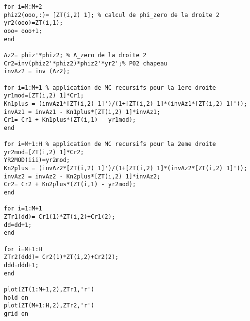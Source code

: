 \begin{appendices}
\begin{lstlisting}
for i=M:M+2
phiz2(ooo,:)= [ZT(i,2) 1]; % calcul de phi_zero de la droite 2
yr2(ooo)=ZT(i,1);
ooo= ooo+1;
end

Az2= phiz'*phiz2; % A_zero de la droite 2
Cr2=inv(phiz2'*phiz2)*phiz2'*yr2';% P02 chapeau
invAz2 = inv (Az2);

for i=1:M+1 % application de MC recursifs pour la 1ere droite
yr1mod=[ZT(i,2) 1]*Cr1;
Kn1plus = (invAz1*[ZT(i,2) 1]')/(1+[ZT(i,2) 1]*(invAz1*[ZT(i,2) 1]'));
invAz1 = invAz1 - Kn1plus*[ZT(i,2) 1]*invAz1;
Cr1= Cr1 + Kn1plus*(ZT(i,1) - yr1mod);
end

for i=M+1:H % application de MC recursifs pour la 2eme droite
yr2mod=[ZT(i,2) 1]*Cr2;
YR2MOD(iii)=yr2mod;
Kn2plus = (invAz2*[ZT(i,2) 1]')/(1+[ZT(i,2) 1]*(invAz2*[ZT(i,2) 1]'));
invAz2 = invAz2 - Kn2plus*[ZT(i,2) 1]*invAz2;
Cr2= Cr2 + Kn2plus*(ZT(i,1) - yr2mod);
end

for i=1:M+1
ZTr1(dd)= Cr1(1)*ZT(i,2)+Cr1(2);
dd=dd+1;
end

for i=M+1:H
ZTr2(ddd)= Cr2(1)*ZT(i,2)+Cr2(2);
ddd=ddd+1;
end

plot(ZT(1:M+1,2),ZTr1,'r')
hold on
plot(ZT(M+1:H,2),ZTr2,'r')
grid on
	 
	\end{lstlisting}
			
\end{appendices}